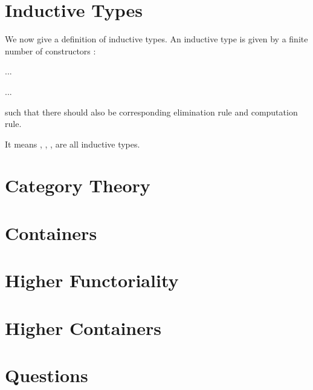 \section{Inductive Types}

We now give a definition of inductive types. An inductive type  is given by a finite number of constructors :

\AgdaSpace{}%
\AgdaSpace{}%
\AgdaSymbol{:}\AgdaSpace{}%
\AgdaSpace{}%
%

%
%
\AgdaSymbol{:}\AgdaSpace{}%
\AgdaSpace{}%
\AgdaSpace{}%
\AgdaSpace{}%
\AgdaSpace{}%
...
\AgdaSpace{}%
%

%
%
\AgdaSymbol{:}\AgdaSpace{}%
\AgdaSpace{}%
\AgdaSpace{}%
\AgdaSpace{}%
\AgdaSpace{}%
...
\AgdaSpace{}%
%

such that there should also be corresponding elimination rule and computation rule.

It means , , ,  are all inductive types.

\section{Category Theory}

\section{Containers}

\section{Higher Functoriality}

\section{Higher Containers}

\section{Questions}
